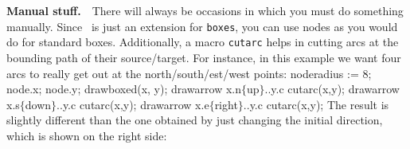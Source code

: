 {\bf Manual stuff.}~~There will always be occasions in which you must do something manually. Since \METAGRAPH\ is
just an extension for {\tt boxes}, you can use nodes as you would do for standard boxes. 
Additionally, a macro {\tt cutarc} helps
in cutting arcs at the bounding path of their source/target. 
For instance, in this example we want four arcs to really get out
at the north/south/est/west points:
\begincode
	noderadius := 8;
	node.x; node.y;
	drawboxed(x, y);
	drawarrow x.n$\{$up$\}$..y.c cutarc(x,y);
	drawarrow x.s$\{$down$\}$..y.c cutarc(x,y);
	drawarrow x.e$\{$right$\}$..y.c cutarc(x,y);
\endcode
The result is slightly different than the one obtained by just changing the initial 
direction, which is shown on the right side:
\bye
